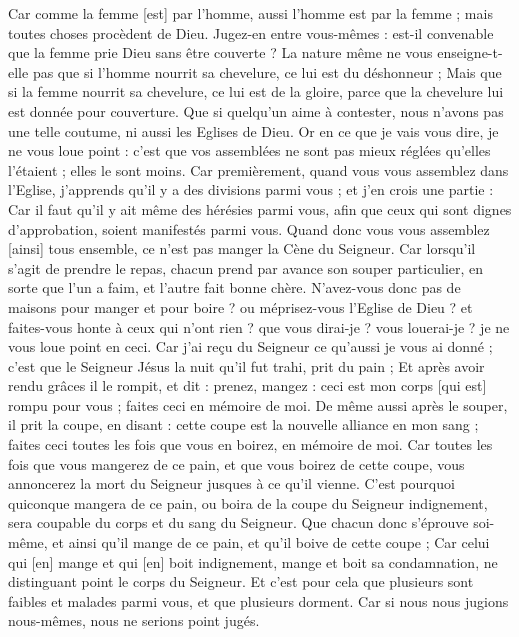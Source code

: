 \begin{multicols}{2}
Car comme la femme [est] par l'homme, aussi l'homme est par la femme ; mais toutes choses procèdent de Dieu.
Jugez-en entre vous-mêmes : est-il convenable que la femme prie Dieu sans être couverte ?
La nature même ne vous enseigne-t-elle pas que si l'homme nourrit sa chevelure, ce lui est du déshonneur ;
Mais que si la femme nourrit sa chevelure, ce lui est de la gloire, parce que la chevelure lui est donnée pour couverture.
Que si quelqu'un aime à contester, nous n'avons pas une telle coutume, ni aussi les Eglises de Dieu.
Or en ce que je vais vous dire, je ne vous loue point : c'est que vos assemblées ne sont pas mieux réglées qu'elles l'étaient ; elles le sont moins.
Car premièrement, quand vous vous assemblez dans l'Eglise, j'apprends qu'il y a des divisions parmi vous ; et j'en crois une partie :
Car il faut qu'il y ait même des hérésies parmi vous, afin que ceux qui sont dignes d'approbation, soient manifestés parmi vous.
Quand donc vous vous assemblez [ainsi] tous ensemble, ce n'est pas manger la Cène du Seigneur.
Car lorsqu'il s'agit de prendre le repas, chacun prend par avance son souper particulier, en sorte que l'un a faim, et l'autre fait bonne chère.
N'avez-vous donc pas de maisons pour manger et pour boire ? ou méprisez-vous l'Eglise de Dieu ? et faites-vous honte à ceux qui n'ont rien ? que vous dirai-je ? vous louerai-je ? je ne vous loue point en ceci.
Car j'ai reçu du Seigneur ce qu'aussi je vous ai donné ; c’est que le Seigneur Jésus la nuit qu'il fut trahi, prit du pain ;
Et après avoir rendu grâces il le rompit, et dit : prenez, mangez : ceci est mon corps [qui est] rompu pour vous ; faites ceci en mémoire de moi.
De même aussi après le souper, il prit la coupe, en disant : cette coupe est la nouvelle alliance en mon sang ; faites ceci toutes les fois que vous en boirez, en mémoire de moi.
Car toutes les fois que vous mangerez de ce pain, et que vous boirez de cette coupe, vous annoncerez la mort du Seigneur jusques à ce qu'il vienne.
C'est pourquoi quiconque mangera de ce pain, ou boira de la coupe du Seigneur indignement, sera coupable du corps et du sang du Seigneur.
Que chacun donc s'éprouve soi-même, et ainsi qu'il mange de ce pain, et qu'il boive de cette coupe ;
Car celui qui [en] mange et qui [en] boit indignement, mange et boit sa condamnation, ne distinguant point le corps du Seigneur.
Et c'est pour cela que plusieurs sont faibles et malades parmi vous, et que plusieurs dorment.
Car si nous nous jugions nous-mêmes, nous ne serions point jugés.

\end{multicols}
